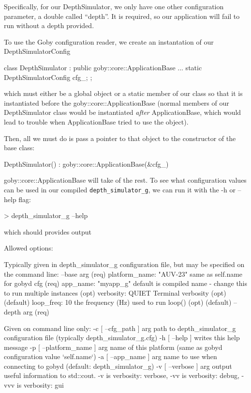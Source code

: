 \documentclass[11pt, letterpaper, oneside]{memoir}
\begin{document}
Specifically, for our DepthSimulator, we only have one other configuration parameter, a double called ``depth''. It is required, so our application will fail to run without a depth provided.

To use the Goby configuration reader, we create an instantation of our DepthSimulatorConfig
\begin{boxedverbatim}
class DepthSimulator : public goby::core::ApplicationBase
{ 
...
    static DepthSimulatorConfig cfg_;
};
\end{boxedverbatim}
\resetbvlinenumber
which must either be a global object or a static member of our class so that it is instantiated before the goby::core::ApplicationBase (normal members of our DepthSimulator class would be instantiated \textit{after} ApplicationBase, which would lead to trouble when ApplicationBase tried to use the object).

Then, all we must do is pass a pointer to that object to the constructor of the base class:
\begin{boxedverbatim}
    DepthSimulator()
        : goby::core::ApplicationBase(&cfg_)
\end{boxedverbatim}
\resetbvlinenumber
goby::core::ApplicationBase will take of the rest. To see what configuration values can be used in our compiled \verb|depth_simulator_g|, we can run it with the -h or --help flag:
\begin{boxedverbatim}
> depth_simulator_g --help
\end{boxedverbatim}
\resetbvlinenumber

which should provides output 
\begin{boxedverbatim}
Allowed options:

Typically given in depth_simulator_g configuration file,
but may be specified on the command line:
  --base arg             (req)
                          platform_name: "AUV-23"  same as self.name for 
                                                   gobyd cfg (req)
                          app_name: "myapp_g"  default is compiled name - 
                                               change this to run multiple 
                                               instances (opt)
                          verbosity: QUIET  Terminal verbosity 
                                            (opt) (default)
                          loop_freq: 10  the frequency (Hz) used to run 
                                         loop() (opt) (default)
  --depth arg            (req)

Given on command line only:
  -c [ --cfg_path ] arg      path to depth_simulator_g configuration file 
                             (typically depth_simulator_g.cfg)
  -h [ --help ]              writes this help message
  -p [ --platform_name ] arg name of this platform (same as gobyd configuration
                             value `self.name`)
  -a [ --app_name ] arg      name to use when connecting to gobyd (default: 
                             depth_simulator_g)
  -v [ --verbose ] arg       output useful information to std::cout. -v is 
                             verbosity: verbose, -vv is verbosity: debug, -vvv 
                             is verbosity: gui
\end{boxedverbatim}
\resetbvlinenumber
\end{document}
